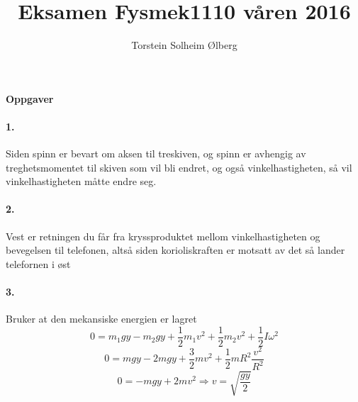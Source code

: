 \documentclass[11pt, A4paper,norsk]{article}
\author{Torstein Solheim Ølberg}
\title{Eksamen Fysmek1110 våren 2016}
\begin{document}
\maketitle
	\begin{center}
\Large \textbf{Oppgaver}
	\end{center}









		\paragraph{1.}
			\begin{flushleft}
Siden spinn er bevart om aksen til treskiven, og spinn er avhengig av treghetsmomentet til skiven som vil bli endret, og også vinkelhastigheten, så vil vinkelhastigheten måtte endre seg.
			\end{flushleft}









		\paragraph{2.}
			\begin{flushleft}
Vest er retningen du får fra kryssproduktet mellom vinkelhastigheten og bevegelsen til telefonen, altså siden korioliskraften er motsatt av det så lander telefornen i øst
			\end{flushleft}

			








		\paragraph{3.}
			\begin{flushleft}
Bruker at den mekansiske energien er lagret
$$0 = m_1 g y - m_2 g y + \frac{1}{2} m_1 v^2 + \frac{1}{2} m_2 v^2 + \frac{1}{2} I \omega^2$$
$$0 = m g y - 2 m g y + \frac{3}{2} m v^2 + \frac{1}{2} m R^2 \frac{v^2}{R^2}$$
$$0 = - m g y + 2 m v^2 \Rightarrow v = \sqrt{\frac{gy}{2}}$$
			\end{flushleft}
\end{document}
